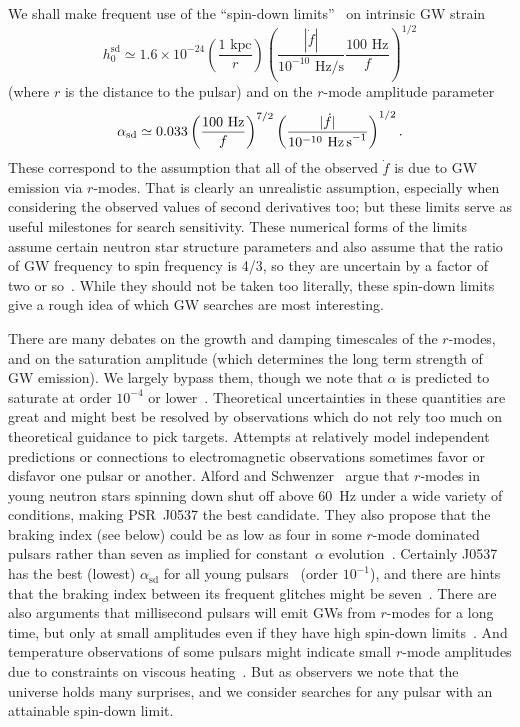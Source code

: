 \documentclass{ttuthes2007}
\begin{document}
We shall make frequent use of the ``spin-down limits''~\cite{Owen:2010ng} on
intrinsic \ac{GW} strain~\cite{Jaranowski:1998qm}
\begin{equation}
h_0^\mathrm{sd} \simeq 1.6\times10^{-24} \left( \frac{\mbox{1 kpc}}{r} \right)
\left( \frac{\left|\dot f\right|} {10^{-10}\mbox{ Hz/s}} \frac{\mbox{100 Hz}}
{f} \right)^{1/2}
\label{h0sd}
\end{equation}
(where $r$ is the distance to the pulsar) and on the $r$-mode amplitude
parameter~\cite{LMoO:1998prl}
\begin{equation}
\alpha_\mathrm{sd} \simeq 0.033 \left( \frac{\mbox{100 Hz}} {f} \right)^{7/2}
\left( \frac{|\dot{f}|} {10^{-10}\mbox{ Hz\,s}^{-1}} \right)^{1/2}.
\end{equation}
These correspond to the assumption that all of the observed $\dot f$ is due to
\ac{GW} emission via $r$-modes.
That is clearly an unrealistic assumption, especially when considering the
observed values of second derivatives too; but these limits serve as useful
milestones for search sensitivity.
These numerical forms of the limits assume certain neutron star structure
parameters and also assume that the ratio of \ac{GW} frequency to spin
frequency is 4/3, so they are uncertain by a factor of two or
so~\cite{Owen:2010ng}.
While they should not be taken too literally, these spin-down limits give a
rough idea of which \ac{GW} searches are most interesting.

There are many debates on the growth and damping timescales of the $r$-modes,
and on the saturation amplitude (which determines the long term strength of
\ac{GW} emission).
We largely bypass them, though we note that $\alpha$ is predicted to saturate
at order $10^{-4}$ or lower~\cite{Arras:2002dw}.
Theoretical uncertainties in these quantities are great and might best be
resolved by observations which do not rely too much on theoretical guidance to
pick targets.
Attempts at relatively model independent predictions or connections to
electromagnetic observations sometimes favor or disfavor one pulsar or
another.
Alford and Schwenzer~\cite{Alford:2012yn} argue that $r$-modes in young
neutron stars spinning down shut off above 60~Hz under a wide variety of
conditions, making PSR~J0537 the best candidate.
They also propose that the braking index (see below) could be as low as four
in some $r$-mode dominated pulsars rather than seven as implied for
constant~$\alpha$ evolution~\cite{Owen:1998xg}.
Certainly J0537 has the best (lowest)
$\alpha_\mathrm{sd}$ for all young pulsars~\cite{Owen:2010ng} (order
$10^{-1}$), and there are hints that the braking index between its frequent
glitches might be seven~\cite{Andersson:2017fow}.
There are also arguments that millisecond pulsars will emit \acp{GW} from
$r$-modes for a long time, but only at small amplitudes even if they have high
spin-down limits~\cite{Bondarescu:2013xwa, Alford:2014pxa}.
And temperature observations of some pulsars might indicate small $r$-mode
amplitudes due to constraints on viscous heating~\cite{Schwenzer:2016tkf}.
But as observers we note that the universe holds many surprises, and we
consider searches for any pulsar with an attainable spin-down limit.
\end{document}
